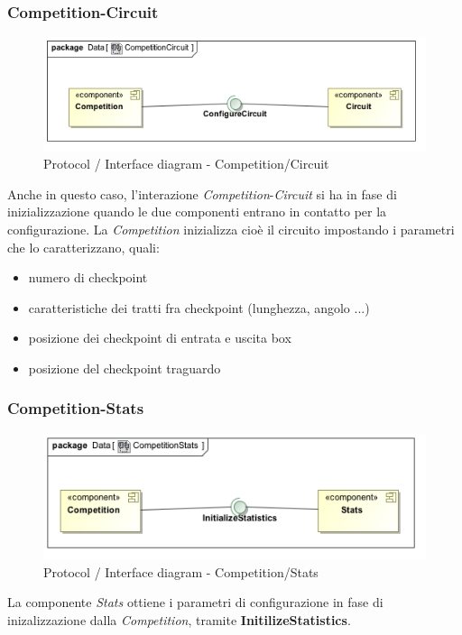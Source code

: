 \subsubsection{Competition-Circuit}
\begin{center}
\begin{figure}[h!]
	\includegraphics[scale=0.55]{img/InteractionDiagram/Implementation_Diagram__CompetitionCircuit.jpg}
\caption{Protocol / Interface diagram - Competition/Circuit}
\end{figure}
\end{center}
Anche in questo caso, l'interazione \emph{Competition}-\emph{Circuit} si ha in fase di inizializzazione quando le due componenti entrano in contatto
per la configurazione. La \emph{Competition} inizializza cio\`{e} il circuito impostando i parametri che lo caratterizzano, quali:
	\begin{itemize}
		\item numero di checkpoint
		\item caratteristiche dei tratti fra checkpoint (lunghezza, angolo ...)
		\item posizione dei checkpoint di entrata e uscita box
		\item posizione del checkpoint traguardo
	\end{itemize}
\subsubsection{Competition-Stats}
\begin{center}
\begin{figure}[h!]
	\includegraphics[scale=0.55]{img/InteractionDiagram/Implementation_Diagram__CompetitionStats.jpg}
\caption{Protocol / Interface diagram - Competition/Stats}
\end{figure}
\end{center}
La componente \emph{Stats} ottiene i parametri di configurazione in fase di inizalizzazione dalla \emph{Competition}, tramite
\textbf{InitilizeStatistics}.
